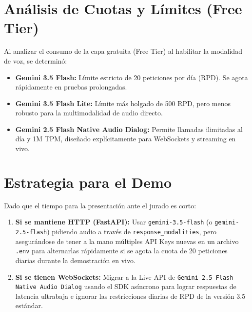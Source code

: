\documentclass{article}
\begin{document}
\section{Análisis de Cuotas y Límites (Free Tier)}
Al analizar el consumo de la capa gratuita (Free Tier) al habilitar la modalidad de voz, se determinó:
\begin{itemize}
    \item \textbf{Gemini 3.5 Flash:} Límite estricto de 20 peticiones por día (RPD). Se agota rápidamente en pruebas prolongadas.
    \item \textbf{Gemini 3.5 Flash Lite:} Límite más holgado de 500 RPD, pero menos robusto para la multimodalidad de audio directo.
    \item \textbf{Gemini 2.5 Flash Native Audio Dialog:} Permite llamadas ilimitadas al día y 1M TPM, diseñado explícitamente para WebSockets y streaming en vivo.
\end{itemize}

\section{Estrategia para el Demo}
Dado que el tiempo para la presentación ante el jurado es corto:
\begin{enumerate}
    \item \textbf{Si se mantiene HTTP (FastAPI):} Usar \texttt{gemini-3.5-flash} (o \texttt{gemini-2.5-flash}) pidiendo audio a través de \texttt{response\_modalities}, pero asegurándose de tener a la mano múltiples API Keys nuevas en un archivo \texttt{.env} para alternarlas rápidamente si se agota la cuota de 20 peticiones diarias durante la demostración en vivo.
    \item \textbf{Si se tienen WebSockets:} Migrar a la Live API de \texttt{Gemini 2.5 Flash Native Audio Dialog} usando el SDK asíncrono para lograr respuestas de latencia ultrabaja e ignorar las restricciones diarias de RPD de la versión 3.5 estándar.
\end{enumerate}
\end{document}
